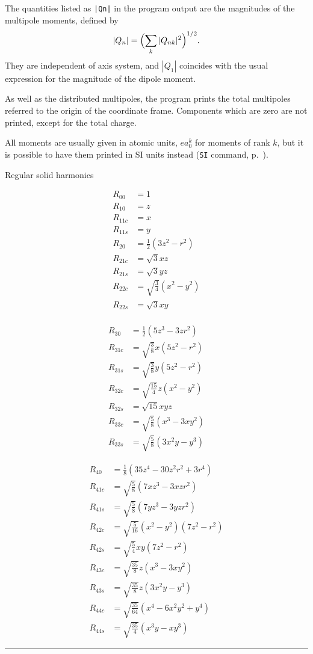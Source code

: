 \documentclass[12pt,txfonts]{paper}
\begin{document}
The quantities listed as \verb+|Qn|+ in the program output are the
magnitudes of the multipole moments, defined by
\begin{equation*}
|Q_n| = \Bigl( \sum_k |Q_{nk}|^2 \Bigr)^{1/2}.
\end{equation*}
They are independent of axis system, and $|Q_1|$ coincides with
the usual expression for the magnitude of the dipole moment.

As well as the distributed multipoles, the program prints the total multipoles
referred to the origin of the coordinate frame. Components which are zero
are not printed, except for the total charge.

All moments are usually given in atomic units, $ea_0^k$ for moments of rank
$k$, but it is possible to have them printed in SI units instead
(\verb+SI+ command, p.~\pageref{SI}).

\newcommand{\half}{\tfrac{1}{2}}
\begin{table}
\caption{Regular solid harmonics}
\parbox[t]{120pt}{%
\begin{align*}
R_{00}&=1\\
R_{10}&=z\\
R_{11c}&=x\\
R_{11s}&=y\\
R_{20}&=\half(3z^2-r^2)\\
R_{21c}&= \sqrt 3 xz\\
R_{21s}&= \sqrt 3 yz\\
R_{22c}&= \sqrt {\tfrac{3}{4}} (x^2-y^2)\\
R_{22s}&= \sqrt 3 xy\\
\end{align*}}
\hfill
\parbox[t]{130pt}{%
\begin{align*}
R_{30}&=\half (5z^3-3zr^2)\\
R_{31c}&=\sqrt {\tfrac{3}{8}} x(5z^2-r^2)\\
R_{31s}&=\sqrt {\tfrac{3}{8}} y(5z^2-r^2)\\
R_{32c}&=\sqrt {\tfrac{15}{4}} z(x^2-y^2)\\
R_{32s}&=\sqrt {15} xyz\\
R_{33c}&=\sqrt {\tfrac{5}{8}} (x^3-3xy^2)\\
R_{33s}&=\sqrt {\tfrac{5}{8}} (3x^2y-y^3)
\end{align*}}
\hfill
\parbox[t]{170pt}{%
\begin{align*}
R_{40}&=\tfrac{1}{8} (35z^4-30z^2r^2+3r^4)\\
R_{41c}&=\sqrt {\tfrac{5}{8}} (7xz^3-3xzr^2)\\
R_{41s}&=\sqrt {\tfrac{5}{8}} (7yz^3-3yzr^2)\\
R_{42c}&=\sqrt {\tfrac{5}{16}} (x^2-y^2)(7z^2-r^2)\\
R_{42s}&=\sqrt {\tfrac{5}{4}} xy(7z^2-r^2)\\
R_{43c}&=\sqrt {\tfrac{35}{8}} z(x^3-3xy^2)\\
R_{43s}&=\sqrt {\tfrac{35}{8}} z(3x^2y-y^3)\\
R_{44c}&=\sqrt {\tfrac{35}{64}} (x^4-6x^2y^2+y^4)\\
R_{44s}&=\sqrt {\tfrac{35}{4}} (x^3y-xy^3)
\end{align*}}
\hrule
\end{table}
\end{document}
